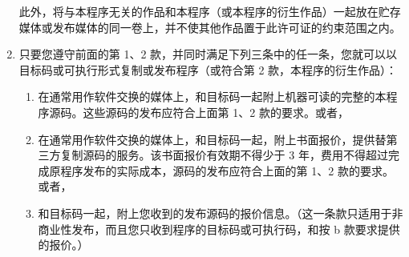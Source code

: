 \begin{enumerate}
        此外，将与本程序无关的作品和本程序（或本程序的衍生作品）一起放在贮存媒体或发布媒体的同一卷上，并不使其他作品置于此许可证的约束范围之内。
    \item 只要您遵守前面的第 1、2 款，并同时满足下列三条中的任一条，您就可以以目标码或可执行形式复制或发布程序（或符合第 2 款，本程序的衍生作品）：
        \begin{enumerate}
            \item 在通常用作软件交换的媒体上，和目标码一起附上机器可读的完整的本程序源码。这些源码的发布应符合上面第 1、2 款的要求。或者，
            \item 在通常用作软件交换的媒体上，和目标码一起，附上书面报价，提供替第三方复制源码的服务。该书面报价有效期不得少于 3 年，费用不得超过完成原程序发布的实际成本，源码的发布应符合上面的第 1、2 款的要求。或者，
            \item 和目标码一起，附上您收到的发布源码的报价信息。（这一条款只适用于非商业性发布，而且您只收到程序的目标码或可执行码，和按 b 款要求提供的报价。）
        \end{enumerate}


\end{enumerate}
